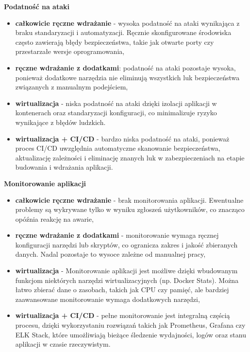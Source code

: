 \documentclass{article}
\begin{document}
\textbf{Podatność na ataki}
\begin{itemize}
    \item \textbf{całkowicie ręczne wdrażanie} - wysoka podatność na ataki wynikająca z braku standaryzacji i automatyzacji. Ręcznie skonfigurowane środowiska często zawierają błędy bezpieczeństwa, takie jak otwarte porty czy przestarzałe wersje oprogramowania,
    \item \textbf{ręczne wdrażanie z dodatkami}: podatność na ataki pozostaje wysoka, ponieważ dodatkowe narzędzia nie eliminują wszystkich luk bezpieczeństwa związanych z manualnym podejściem,
    \item \textbf{wirtualizacja} - niska podatność na ataki dzięki izolacji aplikacji w kontenerach oraz standaryzacji konfiguracji, co minimalizuje ryzyko wynikające z błędów ludzkich.
    \item \textbf{wirtualizacja + CI/CD} - bardzo niska podatność na ataki, ponieważ proces CI/CD uwzględnia automatyczne skanowanie bezpieczeństwa, aktualizację zależności i eliminację znanych luk w zabezpieczeniach na etapie budowania i wdrażania aplikacji.
\end{itemize}

\textbf{Monitorowanie aplikacji}
\begin{itemize}
    \item \textbf{całkowicie ręczne wdrażanie} - brak monitorowania aplikacji. Ewentualne problemy są wykrywane tylko w wyniku zgłoszeń użytkowników, co znacząco opóźnia reakcję na awarie,
    \item \textbf{ręczne wdrażanie z dodatkami} - monitorowanie wymaga ręcznej konfiguracji narzędzi lub skryptów, co ogranicza zakres i jakość zbieranych danych. Nadal pozostaje to wysoce zależne od manualnej pracy,
    \item \textbf{wirtualizacja} - Monitorowanie aplikacji jest możliwe dzięki wbudowanym funkcjom niektórych narzędzi wirtualizacyjnych (np. Docker Stats). Można łatwo zbierać dane o zasobach, takich jak CPU czy pamięć, ale bardziej zaawansowane monitorowanie wymaga dodatkowych narzędzi,
    \item \textbf{wirtualizacja + CI/CD} - pełne monitorowanie jest integralną częścią procesu, dzięki wykorzystaniu rozwiązań takich jak Prometheus, Grafana czy ELK Stack, które umożliwiają bieżące śledzenie wydajności, logów oraz stanu aplikacji w czasie rzeczywistym.
\end{itemize}
\end{document}
